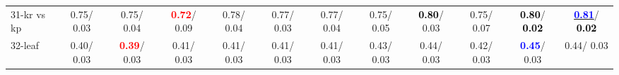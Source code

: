\begin{table}[h]
\begin{center}
{\begin{tabular}{lc|c|c|c|c|c|c|c|c|c|c}
31-kr vs kp &   0.75/  0.03 &   0.75/  0.04 & \textcolor{red}{\textbf{  0.72}}/  0.09 &   0.78/  0.04 &   0.77/  0.03 &   0.77/  0.04 &   0.75/  0.05 & \textcolor{black}{\textbf{  0.80}}/  0.03 &   0.75/  0.07 & \textcolor{black}{\textbf{  0.80}}/\textcolor{black}{\textbf{  0.02}} & \underline{\textcolor{blue}{\textbf{  0.81}}}/\textcolor{black}{\textbf{  0.02}} \\
32-leaf &   0.40/  0.03 & \textcolor{red}{\textbf{  0.39}}/  0.03 &   0.41/  0.03 &   0.41/  0.03 &   0.41/  0.03 &   0.41/  0.03 &   0.43/  0.03 &   0.44/  0.03 &   0.42/  0.03 & \textcolor{blue}{\textbf{  0.45}}/  0.03 &   0.44/  0.03 \\\end{tabular}}\label{stratsALCKappa0aC4.5Redux}
\end{center}
\end{table}

